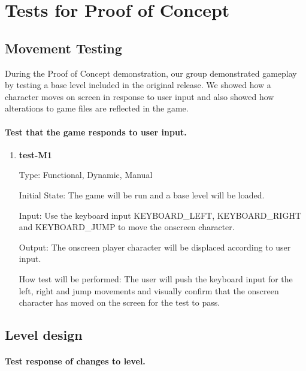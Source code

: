 \documentclass[12pt, titlepage]{article}
\begin{document}
\section{Tests for Proof of Concept}

\subsection{Movement Testing}

During the Proof of Concept demonstration, our group demonstrated gameplay by testing a base level included in the original release. We showed how a character moves on screen in response to user input and also showed how alterations to game files are reflected in the game.

\paragraph{Test that the game responds to user input.}

\begin{enumerate}

\item{\textbf{test-M1\\}}

Type: Functional, Dynamic, Manual

Initial State: The game will be run and a base level will be loaded.

Input: Use the keyboard input KEYBOARD\_LEFT, KEYBOARD\_RIGHT and KEYBOARD\_JUMP         to move the onscreen character.

Output: The onscreen player character will be displaced according to user input.

How test will be performed: The user will push the keyboard input for the left, right and jump movements and visually confirm that the onscreen character has moved on the screen for the test to pass.

\end{enumerate}

\subsection{Level design}

\paragraph{Test response of changes to level.}
\end{document}
